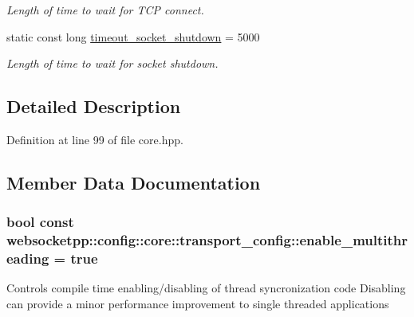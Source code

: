 \begin{DoxyCompactItemize}
\begin{DoxyCompactList}\small\item\em Length of time to wait for T\+CP connect. \end{DoxyCompactList}\item 
static const long \hyperlink{structwebsocketpp_1_1config_1_1core_1_1transport__config_a185b7787fb2ee6bdf8ae5391926b1665}{timeout\+\_\+socket\+\_\+shutdown} = 5000\hypertarget{structwebsocketpp_1_1config_1_1core_1_1transport__config_a185b7787fb2ee6bdf8ae5391926b1665}{}\label{structwebsocketpp_1_1config_1_1core_1_1transport__config_a185b7787fb2ee6bdf8ae5391926b1665}

\begin{DoxyCompactList}\small\item\em Length of time to wait for socket shutdown. \end{DoxyCompactList}\end{DoxyCompactItemize}


\subsection{Detailed Description}


Definition at line 99 of file core.\+hpp.



\subsection{Member Data Documentation}
\subsubsection[{\texorpdfstring{enable\+\_\+multithreading}{enable\_multithreading}}]{\setlength{\rightskip}{0pt plus 5cm}bool const websocketpp\+::config\+::core\+::transport\+\_\+config\+::enable\+\_\+multithreading = true\hspace{0.3cm}{\ttfamily [static]}}\hypertarget{structwebsocketpp_1_1config_1_1core_1_1transport__config_aec8759f2af401067ca30c3c36ec36346}{}\label{structwebsocketpp_1_1config_1_1core_1_1transport__config_aec8759f2af401067ca30c3c36ec36346}
Controls compile time enabling/disabling of thread syncronization code Disabling can provide a minor performance improvement to single threaded applications 

